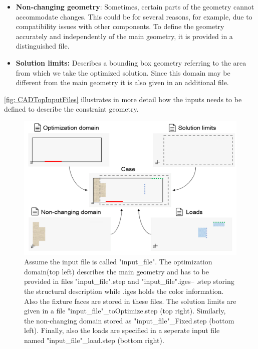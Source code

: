 \begin{itemize}
	\item \textbf{Non-changing geometry}: Sometimes, certain parts of the geometry cannot accommodate changes. This could be for several reasons, for example, due to compatibility issues with other components. To define the geometry accurately and independently of the main geometry, it is provided in a distinguished file.%
	\item \textbf{Solution limits:} Describes a bounding box geometry referring to the area from which we take the optimized solution. Since this domain may be different from the main geometry it is also given in an additional file.
\end{itemize}

\autoref{fig: CADTopInputFiles} illustrates in more detail how the inputs needs to be defined to describe the constraint geometry. 

\begin{figure}[ht]
\includegraphics[width=\textwidth]{Pictures/four_files.png}
\caption{Assume the input file is called "input{\_}file". The optimization domain(top left) describes the main geometry and has to be provided in files "input{\_}file".step and "input{\_}file".iges-- .step storing the structural description while .iges holds the color information. Also the fixture faces are stored in these files. The solution limits are given in a file "input{\_}file"{\_}toOptimize.step (top right). Similarly, the non-changing domain stored as "input{\_}file"{\_}Fixed.step (bottom left). Finally, also the loads are specified in a seperate input file named "input{\_}file"{\_}load.step (bottom right).}
\label{fig: CADTopInputFiles}
\end{figure}
